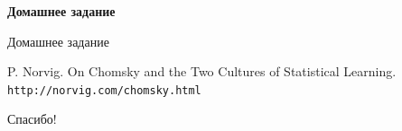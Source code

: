 \documentclass{beamer}
\begin{document}
\begin{frame}{}
\begin{center}
	\textbf{Домашнее задание}
\end{center}
\end{frame}

\begin{frame}{Домашнее задание}
\begin{center}
{\small P. Norvig. On Chomsky and the Two Cultures of Statistical Learning.}\\
\medskip
\texttt{http://norvig.com/chomsky.html}
\end{center}
\end{frame}


\begin{frame}{}
    \thispagestyle{empty}
    \begin{center}
        {\large Спасибо!}
    \end{center}
\end{frame}
\end{document}
